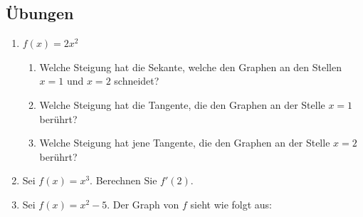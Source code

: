 \subsection{Übungen}
\begin{enumerate}
    \item \( f(x) = 2x^2 \)
          \begin{enumerate}
              \item  Welche Steigung hat die Sekante, welche den Graphen an den Stellen \( x = 1 \) und \( x = 2 \) schneidet?
              \item Welche Steigung hat die Tangente, die den Graphen an der Stelle \( x = 1 \) berührt?
              \item Welche Steigung hat jene Tangente, die den Graphen an der Stelle \( x = 2 \) berührt?
          \end{enumerate}

    \item Sei \( f(x) = x^3 \).
          Berechnen Sie \( f'(2) \).

    \item Sei \( f(x) = x^2 - 5 \). Der Graph von $f$ sieht wie folgt aus:

\end{enumerate}
